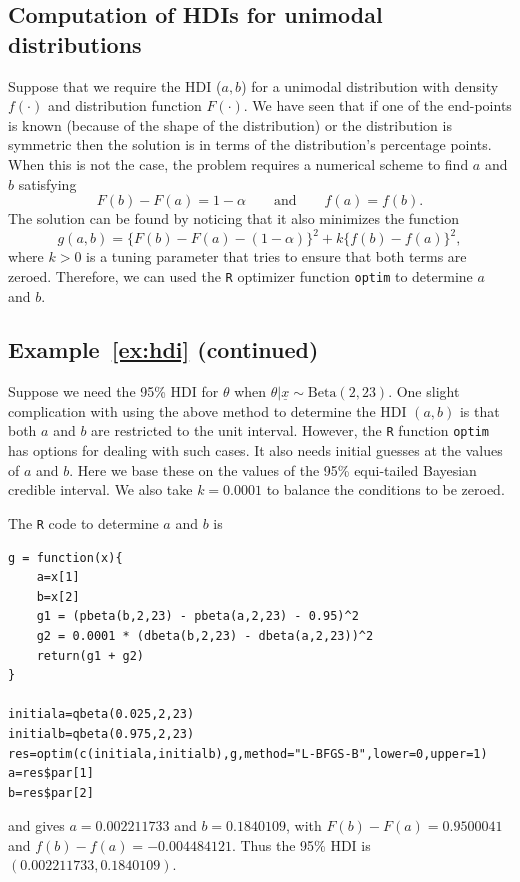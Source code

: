 {\subsection*{Computation of HDIs for unimodal distributions}
Suppose that we require the HDI ($a,b$) for a unimodal distribution
with density $f(\cdot)$ and distribution function $F(\cdot)$.  We have
seen that if one of the end-points is known (because of the shape of
the distribution) or the distribution is symmetric then the solution
is in terms of the distribution's percentage points. When this is not
the case, the problem requires a numerical scheme to find $a$ and
$b$ satisfying
$$
F(b)-F(a)=1-\alpha \quad\quad\text{and}\quad\quad f(a)=f(b).
$$
The solution can be found by noticing that it also minimizes the
function
$$
g(a,b)=\bigl\{F(b)-F(a)-(1-\alpha)\bigr\}^2+k\bigl\{f(b)-f(a)\bigr\}^2,
$$
where $k>0$ is a tuning parameter that tries to ensure that both terms
are zeroed.  Therefore, we can used the \texttt{R} optimizer function
\texttt{optim} to determine $a$ and $b$.

\subsection*{Example~\ref{ex:hdi} (continued)}
Suppose we need the 95\% HDI for $\theta$ when $\theta|\underline{x}\sim \text{Beta}(2,23)$. One slight complication with using the above method to determine the HDI $(a,b)$ is that both $a$ and $b$ are restricted to the unit interval. However, the \texttt{R} function \texttt{optim} has options for dealing with such cases. It also needs initial guesses at the values of $a$ and $b$. Here we base these on the values of the 95\% equi-tailed Bayesian credible interval. We also take $k=0.0001$ to balance the conditions to be zeroed.

The \texttt{R} code to determine $a$ and $b$ is 
\begin{verbatim}
g = function(x){
    a=x[1]
    b=x[2]
    g1 = (pbeta(b,2,23) - pbeta(a,2,23) - 0.95)^2
    g2 = 0.0001 * (dbeta(b,2,23) - dbeta(a,2,23))^2
    return(g1 + g2)
}

initiala=qbeta(0.025,2,23)
initialb=qbeta(0.975,2,23)
res=optim(c(initiala,initialb),g,method="L-BFGS-B",lower=0,upper=1)
a=res$par[1] 
b=res$par[2]
\end{verbatim}
and gives $a=0.002211733$ and $b=0.1840109$, with $F(b)-F(a)=0.9500041$ and $f(b)-f(a)=-0.004484121$. Thus the 95\% HDI is $(0.002211733,0.1840109)$.}

\newpage


